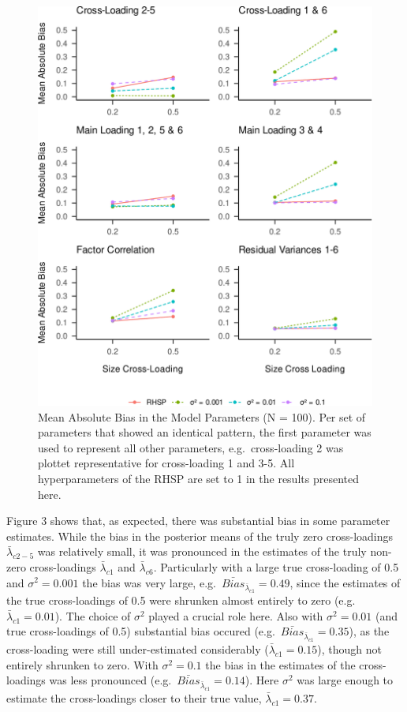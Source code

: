 \documentclass[
  man, donotrepeattitle,floatsintext]{apa6}
\begin{document}
\begin{figure}
\centering
\includegraphics{JMBKoch_thesis_files/figure-latex/unnamed-chunk-4-1.pdf}
\caption{\label{fig:unnamed-chunk-4}Mean Absolute Bias in the Model Parameters (N = 100). Per set of parameters that showed an identical pattern, the first parameter was used to represent all other parameters, e.g.~cross-loading 2 was plottet representative for cross-loading 1 and 3-5. All hyperparameters of the RHSP are set to 1 in the results presented here.}
\end{figure}

Figure 3 shows that, as expected, there was substantial bias in some parameter estimates. While the bias in the posterior means of the truly zero cross-loadings \(\bar{\lambda}_{c 2-5}\) was relatively small, it was pronounced in the estimates of the truly non-zero cross-loadings \(\bar{\lambda}_{c 1}\) and \(\bar{\lambda}_{c 6}\). Particularly with a large true cross-loading of 0.5 and \(\sigma^2 = 0.001\) the bias was very large, e.g.~\(\bar{Bias}_{\bar{\lambda}_{c 1}} = 0.49\), since the estimates of the true cross-loadings of 0.5 were shrunken almost entirely to zero (e.g.~\(\bar{\lambda}_{c 1} = 0.01\)). The choice of \(\sigma^2\) played a crucial role here. Also with \(\sigma^2 = 0.01\) (and true cross-loadings of 0.5) substantial bias occured (e.g.~\(\bar{Bias}_{\bar{\lambda}_{c 1}} = 0.35\)), as the cross-loading were still under-estimated considerably (\(\bar{\lambda}_{c 1} = 0.15\)), though not entirely shrunken to zero. With \(\sigma^2 = 0.1\) the bias in the estimates of the cross-loadings was less pronounced (e.g.~\(\bar{Bias}_{\bar{\lambda}_{c 1}} = 0.14\)). Here \(\sigma^2\) was large enough to estimate the cross-loadings closer to their true value, \(\bar{\lambda}_{c 1} = 0.37\).
\end{document}
